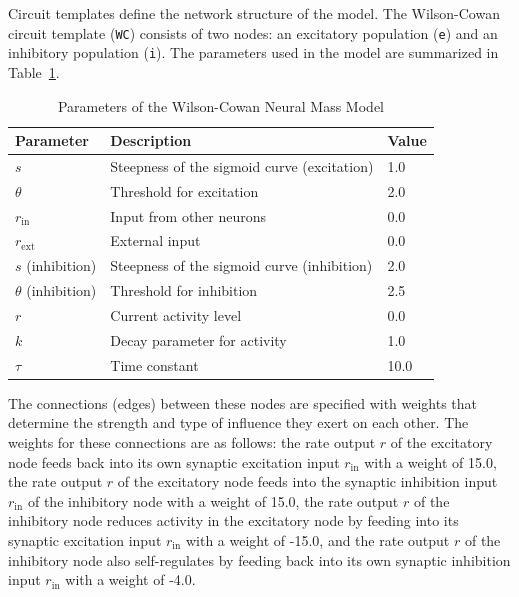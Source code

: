 \documentclass[12pt]{article}
\begin{document}
Circuit templates define the network structure of the model. The Wilson-Cowan circuit template (\texttt{WC}) consists of two nodes: an excitatory population (\texttt{e}) and an inhibitory population (\texttt{i}). The parameters used in the model are summarized in Table~\ref{tab:parameters}.

\begin{table}[h]
    \centering
    \caption{Parameters of the Wilson-Cowan Neural Mass Model}
    \label{tab:parameters}
    \begin{tabular}{@{}lll@{}}
        \toprule
        \textbf{Parameter} & \textbf{Description} & \textbf{Value} \\ \midrule
        \( s \) & Steepness of the sigmoid curve (excitation) & 1.0 \\
        \( \theta \) & Threshold for excitation & 2.0 \\
        \( r_{\mathrm{in}} \) & Input from other neurons & 0.0 \\
        \( r_{\mathrm{ext}} \) & External input & 0.0 \\
        \( s \) (inhibition) & Steepness of the sigmoid curve (inhibition) & 2.0 \\
        \( \theta \) (inhibition) & Threshold for inhibition & 2.5 \\
        \( r \) & Current activity level & 0.0 \\
        \( k \) & Decay parameter for activity & 1.0 \\
        \( \tau \) & Time constant & 10.0 \\ \bottomrule
    \end{tabular}
\end{table}

The connections (edges) between these nodes are specified with weights that determine the strength and type of influence they exert on each other. The weights for these connections are as follows: the rate output \( r \) of the excitatory node feeds back into its own synaptic excitation input \( r_{\mathrm{in}} \) with a weight of 15.0, the rate output \( r \) of the excitatory node feeds into the synaptic inhibition input \( r_{\mathrm{in}} \) of the inhibitory node with a weight of 15.0, the rate output \( r \) of the inhibitory node reduces activity in the excitatory node by feeding into its synaptic excitation input \( r_{\mathrm{in}} \) with a weight of -15.0, and the rate output \( r \) of the inhibitory node also self-regulates by feeding back into its own synaptic inhibition input \( r_{\mathrm{in}} \) with a weight of -4.0.
\end{document}
